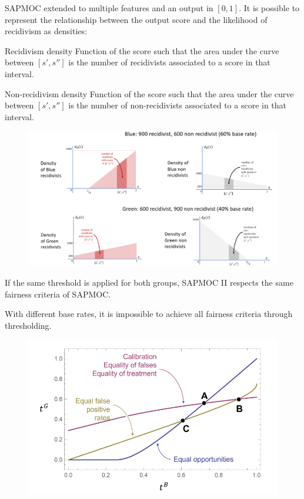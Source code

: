\begin{example}[SAPMOC II]
    SAPMOC extended to multiple features and an output in $[0, 1]$. It is possible to represent the relationship between the output score and the likelihood of recidivism as densities:
    \begin{descriptionlist}
        \item[Recidivism density]
            Function of the score such that the area under the curve between $[s', s'']$ is the number of recidivists associated to a score in that interval.

        \item[Non-recidivism density]
            Function of the score such that the area under the curve between $[s', s'']$ is the number of non-recidivists associated to a score in that interval.
    \end{descriptionlist}

    \begin{figure}[H]
        \centering
        \includegraphics[width=0.75\linewidth]{./img/sapmoc_density.png}
    \end{figure}

    If the same threshold is applied for both groups, SAPMOC II respects the same fairness criteria of SAPMOC.
\end{example}

\begin{theorem}
    With different base rates, it is impossible to achieve all fairness criteria through thresholding.

    \begin{figure}[H]
        \centering
        \includegraphics[width=0.45\linewidth]{./img/pasmoc2_thresholds.png}
    \end{figure}
\end{theorem}